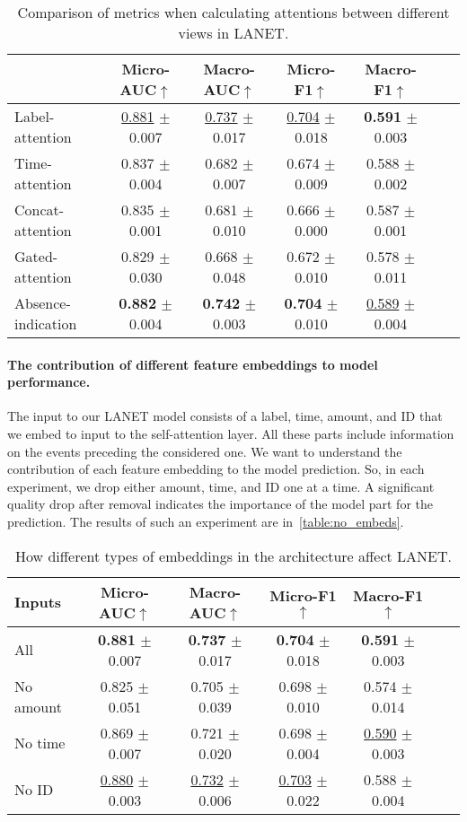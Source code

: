 \documentclass[runningheads]{llncs}
\begin{document}
\begin{table}[ht!]
\centering
\small
\begin{tabular}{lcccccc}
\hline
 & Micro-AUC$\uparrow$ & Macro-AUC$\uparrow$ & Micro-F1$\uparrow$ & Macro-F1$\uparrow$\\ 
\hline
Label-attention & \underline{0.881} $\pm$ 0.007 & \underline{0.737} $\pm$ 0.017 & \underline{0.704} $\pm$ 0.018 & \textbf{0.591} $\pm$ 0.003\\
Time-attention & 0.837 $\pm$ 0.004 & 0.682 $\pm$ 0.007 & 0.674 $\pm$ 0.009  & 0.588 $\pm$ 0.002 \\
Concat-attention & 0.835 $\pm$ 0.001 & 0.681 $\pm$ 0.010 & 0.666 $\pm$ 0.000 & 0.587 $\pm$ 0.001 \\
Gated-attention & 0.829 $\pm$ 0.030 & 0.668 $\pm$ 0.048 & 0.672 $\pm$ 0.010 & 0.578 $\pm$ 0.011 \\
\hline
 Absence-indication & \textbf{0.882} $\pm$ 0.004 & \textbf{0.742} $\pm$ 0.003 & \textbf{0.704} $\pm$ 0.010 & \underline{0.589} $\pm$ 0.004 \\
\hline
\end{tabular}
\centering
\caption{Comparison of metrics when calculating attentions between different views in LANET. }
\label{table:attents}
\end{table}

\paragraph{\textbf{The contribution of different feature embeddings to model performance.}}
The input to our LANET model consists of a label, time, amount, and ID that we embed to input to the self-attention layer. All these parts include information on the events preceding the considered one. We want to understand the contribution of each feature embedding to the model prediction. So, in each experiment, we drop either amount, time, and ID one at a time. A significant quality drop after removal indicates the importance of the model part for the prediction. The results of such an experiment are in~\autoref{table:no_embeds}.    

\begin{table}[ht!]
\centering
\small
\begin{tabular}{lcccccc}
\hline
Inputs & Micro-AUC$\uparrow$ & Macro-AUC$\uparrow$ & Micro-F1$\uparrow$ & Macro-F1$\uparrow$\\ 
\hline
All & \textbf{0.881} $\pm$ 0.007 & \textbf{0.737} $\pm$ 0.017 & \textbf{0.704} $\pm$ 0.018 & \textbf{0.591} $\pm$ 0.003\\
No amount & 0.825 $\pm$ 0.051 & 0.705 $\pm$ 0.039 & 0.698 $\pm$ 0.010 & 0.574 $\pm$ 0.014 \\
No time & 0.869 $\pm$ 0.007 & 0.721 $\pm$ 0.020 & 0.698 $\pm$ 0.004 & \underline{0.590} $\pm$ 0.003 \\
No ID & \underline{0.880} $\pm$ 0.003 & \underline{0.732} $\pm$ 0.006 & \underline{0.703} $\pm$ 0.022 & 0.588 $\pm$ 0.004 \\
    \hline
\end{tabular}
\centering
\caption{How different types of embeddings in the architecture affect LANET.}
\label{table:no_embeds}
\end{table}
\end{document}
